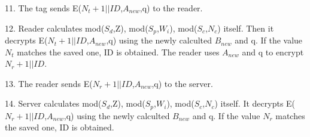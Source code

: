 {    11. The tag sends E($N_t+1||ID$,$A_{new}$,q) to the reader.
    
    12. Reader calculates mod($S_d$,Z), mod($S_p$,$W_i$), mod($S_c$,$N_c$) itself. Then it decrypts E($N_t+1||ID$,$A_{new}$,q) 
    using the newly calculted $B_{new}$ and q. If the value $N_t$ matches the saved one, ID is obtained. The reader uses $A_{new}$ and q to encrypt $N_r+1||ID$. 

    13. The reader sends E($N_r+1||ID$,$A_{new}$,q) to the server.

    14. Server calculates mod($S_d$,Z), mod($S_p$,$W_i$), mod($S_c$,$N_c$) itself. It decrypts E($N_r+1||ID$,$A_{new}$,q) using the newly calculted $B_{new}$ and q. If the value $N_r$ 
    matches the saved one, ID is obtained.
    
}


